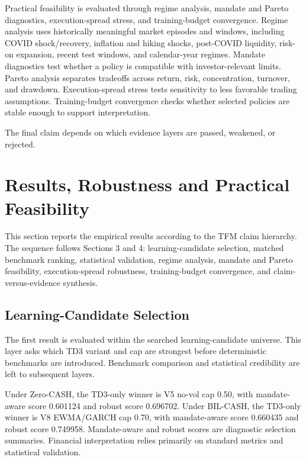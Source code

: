 \documentclass[12pt]{article}
\begin{document}
Practical feasibility is evaluated through regime analysis, mandate and Pareto diagnostics, execution-spread stress, and training-budget convergence. Regime analysis uses historically meaningful market episodes and windows, including COVID shock/recovery, inflation and hiking shocks, post-COVID liquidity, risk-on expansion, recent test windows, and calendar-year regimes. Mandate diagnostics test whether a policy is compatible with investor-relevant limits. Pareto analysis separates tradeoffs across return, risk, concentration, turnover, and drawdown. Execution-spread stress tests sensitivity to less favorable trading assumptions. Training-budget convergence checks whether selected policies are stable enough to support interpretation.

The final claim depends on which evidence layers are passed, weakened, or rejected.

\newpage

\section{Results, Robustness and Practical Feasibility}

This section reports the empirical results according to the TFM claim hierarchy. The sequence follows Sections 3 and 4: learning-candidate selection, matched benchmark ranking, statistical validation, regime analysis, mandate and Pareto feasibility, execution-spread robustness, training-budget convergence, and claim-versus-evidence synthesis.

\subsection{Learning-Candidate Selection}

The first result is evaluated within the searched learning-candidate universe. This layer asks which TD3 variant and cap are strongest before deterministic benchmarks are introduced. Benchmark comparison and statistical credibility are left to subsequent layers.

Under Zero-CASH, the TD3-only winner is V5 no-vol cap 0.50, with mandate-aware score 0.601124 and robust score 0.696702. Under BIL-CASH, the TD3-only winner is V8 \mbox{EWMA/GARCH} cap 0.70, with mandate-aware score 0.660435 and robust score 0.749958. Mandate-aware and robust scores are diagnostic selection summaries. Financial interpretation relies primarily on standard metrics and statistical validation.
\end{document}
